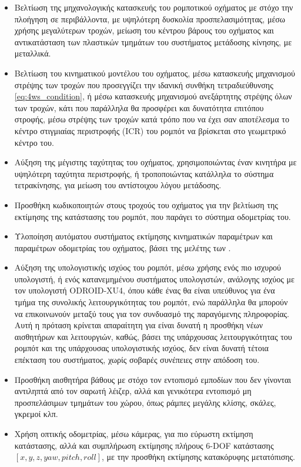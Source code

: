 \begin{itemize}
	\item Βελτίωση της μηχανολογικής κατασκευής του ρομποτικού οχήματος με στόχο την πλοήγηση σε περιβάλλοντα, με υψηλότερη δυσκολία προσπελασιμότητας, μέσω χρήσης μεγαλύτερων τροχών, μείωση του κέντρου βάρους του οχήματος και αντικατάσταση των πλαστικών τμημάτων του συστήματος μετάδοσης κίνησης, με μεταλλικά.
	\item Βελτίωση του κινηματικού μοντέλου του οχήματος, μέσω κατασκευής μηχανισμού στρέψης των τροχών που προσεγγίζει την ιδανική συνθήκη τετραδιεύθυνσης \ref{eq:4ws_condition}, ή μέσω κατασκευής μηχανισμού ανεξάρτητης στρέψης όλων των τροχών, κάτι που παράλληλα θα προσφέρει και δυνατότητα επιτόπου στροφής, μέσω στρέψης των τροχών κατά τρόπο που να έχει σαν αποτέλεσμα το κέντρο στιγμιαίας περιστροφής (ICR) του ρομπότ να βρίσκεται στο γεωμετρικό κέντρο του.
	\item Αύξηση της μέγιστης ταχύτητας του οχήματος, χρησιμοποιώντας έναν κινητήρα με υψηλότερη ταχύτητα περιστροφής, ή τροποποιώντας κατάλληλα το σύστημα τετρακίνησης, για μείωση του αντίστοιχου λόγου μετάδοσης.
	\item Προσθήκη κωδικοποιητών στους τροχούς του οχήματος για την βελτίωση της εκτίμησης της κατάστασης του ρομπότ, που παράγει το σύστημα οδομετρίας του.
	\item Υλοποίηση αυτόματου συστήματος εκτίμησης κινηματικών παραμέτρων και παραμέτρων οδομετρίας του οχήματος, βάσει της μελέτης των \citeauthor{automated_odometry} \cite{automated_odometry}.
	\item Αύξηση της υπολογιστικής ισχύος του ρομπότ, μέσω χρήσης ενός πιο ισχυρού υπολογιστή, ή ενός κατανεμημένου συστήματος υπολογιστών, ανάλογης ισχύος με τον υπολογιστή ODROID-XU4, όπου κάθε ένας θα είναι υπεύθυνος για ένα τμήμα της συνολικής λειτουργικότητας του ρομπότ, ενώ παράλληλα θα μπορούν να επικοινωνούν μεταξύ τους για τον συνδυασμό της παραγόμενης πληροφορίας. Αυτή η πρόταση κρίνεται απαραίτητη για είναι δυνατή η προσθήκη νέων αισθητήρων και λειτουργιών, καθώς, βάσει της υπάρχουσας λειτουργικότητας του ρομπότ και της υπάρχουσας υπολογιστικής ισχύος, δεν είναι δυνατή τέτοια επέκταση του συστήματος, χωρίς σοβαρές συνέπειες στην απόδοση του.
	\item Προσθήκη αισθητήρα βάθους με στόχο τον εντοπισμό εμποδίων που δεν γίνονται αντιληπτά από τον σαρωτή λέιζερ, αλλά και γενικότερα εντοπισμό μη προσπελάσιμων τμημάτων του χώρου, όπως ράμπες μεγάλης κλίσης, σκάλες, γκρεμοί κλπ.
	\item Χρήση οπτικής οδομετρίας, μέσω κάμερας, για πιο εύρωστη εκτίμηση κατάστασης, αλλά και συμπλήρωση εκτίμησης πλήρους 6-DOF κατάστασης $[x,y,z,yaw,pitch,roll]$, με την προσθήκη εκτίμησης κατακόρυφης μετατόπισης.

\end{itemize}
